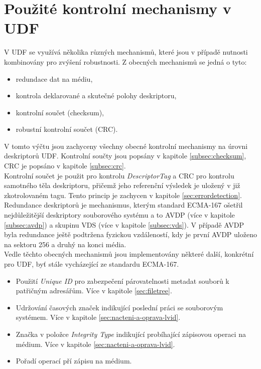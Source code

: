 \section{Použité kontrolní mechanismy v UDF}
\label{sec:kontrolni-mechanismy}
V UDF se využívá několika různých mechanismů, které jsou v případě nutnosti kombinovány pro zvýšení robustnosti. Z obecných mechanismů se jedná o tyto:
\begin{itemize}
    \item redundace dat na médiu,
    \item kontrola deklarované a skutečné polohy deskriptoru,
    \item kontrolní součet (checksum),
    \item robustní kontrolní součet (CRC).
\end{itemize}
V tomto výčtu jsou zachyceny všechny obecné kontrolní mechanismy na úrovni deskriptorů UDF. Kontrolní součty jsou popsány v kapitole \ref{subsec:checksum}, CRC je popsáno v kapitole \ref{subsec:crc}.\\
Kontrolní součet je použit pro kontrolu \textit{DescriptorTag} a CRC pro kontrolu samotného těla deskriptoru, přičemž jeho referenční výsledek je uložený v již zkotrolovaném tagu. Tento princip je zachycen v kapitole \ref{sec:errordetection}.\\
Redundance deskriptorů je mechanismus, kterým standard ECMA-167 ošetřil nejdůležitější deskriptory souborového systému a to AVDP (více v kapitole \ref{subsec:avdp}) a skupinu VDS (více v kapitole \ref{subsec:vds}). V případě AVDP byla redundance ještě podtržena fyzickou vzdáleností, kdy je první AVDP uloženo na sektoru 256 a druhý na konci média.\\
Vedle těchto obecných mechanismů jsou implementovány některé další, konkrétní pro UDF, byť stále vycházející ze standardu ECMA-167.
\begin{itemize}
    \item Použití \textit{Unique ID} pro zabezpečení párovatelnosti metadat souborů k patřičným adresářům. Více v kapitole \ref{sec:filetree}. 
    \item Udržování časových značek indikující poslední práci se souborovým systémem. Více v kapitole \ref{sec:nacteni-a-oprava-lvid}.
    \item Značka v položce \textit{Integrity Type} indikující probíhající zápisovou operaci na médium. Více v kapitole \ref{sec:nacteni-a-oprava-lvid}.
    \item Pořadí operací pří zápisu na médium.
\end{itemize}
